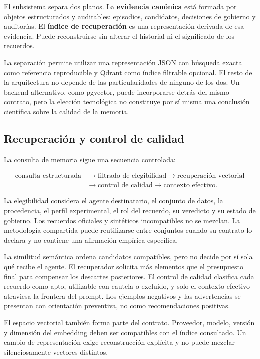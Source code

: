 El subsistema separa dos planos. La \textbf{evidencia canónica} está formada por
objetos estructurados y auditables: episodios, candidatos, decisiones de
gobierno y auditorías. El \textbf{índice de recuperación} es una representación
derivada de esa evidencia. Puede reconstruirse sin alterar el historial ni el
significado de los recuerdos.

La separación permite utilizar una representación JSON con búsqueda exacta
como referencia reproducible y Qdrant como índice filtrable opcional. El resto
de la arquitectura no depende de las particularidades de ninguno de los dos.
Un backend alternativo, como pgvector, puede incorporarse detrás del mismo
contrato, pero la elección tecnológica no constituye por sí misma una
conclusión científica sobre la calidad de la memoria.

\subsection{Recuperación y control de calidad}

La consulta de memoria sigue una secuencia controlada:

\[
\begin{aligned}
\text{consulta estructurada}
&\longrightarrow \text{filtrado de elegibilidad}
\longrightarrow \text{recuperación vectorial} \\
&\longrightarrow \text{control de calidad}
\longrightarrow \text{contexto efectivo}.
\end{aligned}
\]

La elegibilidad considera el agente destinatario, el conjunto de datos, la
procedencia, el perfil experimental, el rol del recuerdo, su veredicto y su
estado de gobierno. Los recuerdos oficiales y sintéticos incompatibles no se
mezclan. La metodología compartida puede reutilizarse entre conjuntos cuando
su contrato lo declara y no contiene una afirmación empírica específica.

La similitud semántica ordena candidatos compatibles, pero no decide por sí
sola qué recibe el agente. El recuperador solicita más elementos que el
presupuesto final para compensar los descartes posteriores. El control de
calidad clasifica cada recuerdo como apto, utilizable con cautela o excluido, y
solo el contexto efectivo atraviesa la frontera del prompt. Los ejemplos
negativos y las advertencias se presentan con orientación preventiva, no como
recomendaciones positivas.

El espacio vectorial también forma parte del contrato. Proveedor, modelo,
versión y dimensión del embedding deben ser compatibles con el índice
consultado. Un cambio de representación exige reconstrucción explícita y no
puede mezclar silenciosamente vectores distintos.

